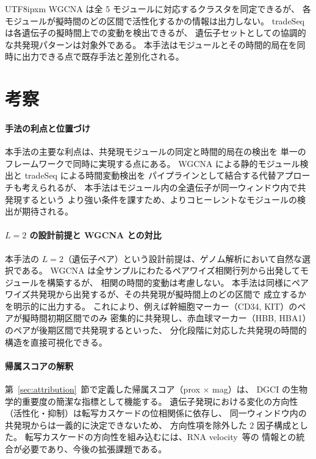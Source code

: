 \documentclass[11pt,a4paper]{article}
\begin{document}
\begin{CJK}{UTF8}{ipxm}
WGCNA は全 5 モジュールに対応するクラスタを同定できるが、
各モジュールが擬時間のどの区間で活性化するかの情報は出力しない。
tradeSeq は各遺伝子の擬時間上での変動を検出できるが、
遺伝子セットとしての協調的な共発現パターンは対象外である。
本手法はモジュールとその時間的局在を同時に出力できる点で既存手法と差別化される。

\section{考察}
\label{sec:discussion}

\paragraph{手法の利点と位置づけ}
本手法の主要な利点は、共発現モジュールの同定と時間的局在の検出を
単一のフレームワークで同時に実現する点にある。
WGCNA による静的モジュール検出と tradeSeq による時間変動検出を
パイプラインとして結合する代替アプローチも考えられるが、
本手法はモジュール内の全遺伝子が同一ウィンドウ内で共発現するという
より強い条件を課すため、よりコヒーレントなモジュールの検出が期待される。

\paragraph{$L=2$ の設計前提と WGCNA との対比}
本手法の $L=2$（遺伝子ペア）という設計前提は、ゲノム解析において自然な選択である。
WGCNA は全サンプルにわたるペアワイズ相関行列から出発してモジュールを構築するが、
相関の時間的変動は考慮しない。
本手法は同様にペアワイズ共発現から出発するが、その共発現が擬時間上のどの区間で
成立するかを明示的に出力する。
これにより、例えば幹細胞マーカー（CD34, KIT）のペアが擬時間初期区間でのみ
密集的に共発現し、赤血球マーカー（HBB, HBA1）のペアが後期区間で共発現するといった、
分化段階に対応した共発現の時間的構造を直接可視化できる。

\paragraph{帰属スコアの解釈}
第~\ref{sec:attribution}~節で定義した帰属スコア（prox $\times$ mag）は、
DGCI の生物学的重要度の簡潔な指標として機能する。
遺伝子発現における変化の方向性（活性化・抑制）は転写カスケードの位相関係に依存し、
同一ウィンドウ内の共発現からは一義的に決定できないため、
方向性項を除外した 2 因子構成とした。
転写カスケードの方向性を組み込むには、RNA velocity~\cite{lange2022cellrank}等の
情報との統合が必要であり、今後の拡張課題である。


\end{CJK}
\end{document}
